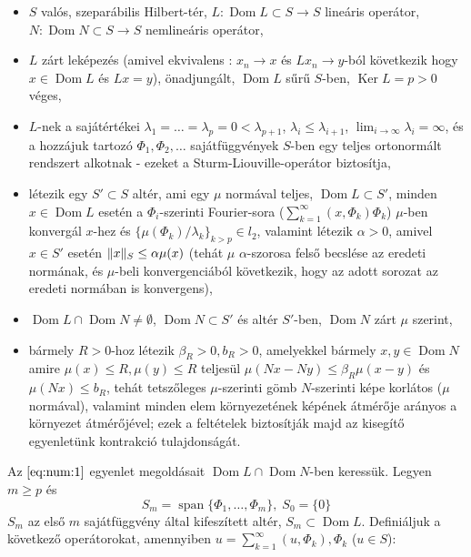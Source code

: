 \documentclass[oneside, titlepage, 12pt, a4paper]{report}
\DeclareMathOperator{\Ker}{Ker}	%
\DeclareMathOperator{\Dom}{Dom}	%
\DeclareMathOperator{\Span}{span}	%
\DeclarePairedDelimiter\norm{\lVert}{\rVert}	%
\begin{document}
\begin{itemize}
\item $S$ valós, szeparábilis Hilbert-tér, $L : \Dom L \subset S \rightarrow S$ lineáris operátor, $N : \Dom N \subset S \rightarrow S$ nemlineáris operátor,
\item $L$ zárt leképezés (amivel ekvivalens \cite{funkanal}: $x_n \rightarrow x$ és $Lx_n \rightarrow y$-ból következik hogy $x \in \Dom L$ és $Lx = y$), önadjungált, $\Dom L$ sűrű $S$-ben, $\Ker L = p > 0$ véges,
\item $L$-nek a sajátértékei $\lambda_1 = \dots = \lambda_p = 0 < \lambda_{p + 1}$, $\lambda_i \leq \lambda_{i + 1}$, $\lim_{i \to \infty} \lambda_i = \infty$, és a hozzájuk tartozó $\Phi_1, \Phi_2, \dots$ sajátfüggvények $S$-ben egy teljes ortonormált rendszert alkotnak - ezeket a Sturm-Liouville-operátor biztosítja, %
\item létezik egy $S' \subset S$ altér, ami egy $\mu$ normával teljes, $\Dom L \subset S'$, minden $x \in \Dom L$ esetén a $\Phi_i$-szerinti Fourier-sora ($\sum_{k=1}^\infty (x, \Phi_k) \Phi_k$) $\mu$-ben konvergál $x$-hez és $\{ \mu(\Phi_k) / \lambda_k\}_{k > p} \in l_2$, valamint létezik $\alpha > 0$, amivel $x \in S'$ esetén $\norm {x}_S \leq \alpha \mu(x)$ (tehát $\mu$ $\alpha$-szorosa felső becslése az eredeti normának, és $\mu$-beli konvergenciából következik, hogy az adott sorozat az eredeti normában is konvergens),
\item $\Dom L \cap \Dom N \neq \emptyset$, $\Dom N \subset S'$ és altér $S'$-ben, $\Dom N$ zárt $\mu$ szerint,
\item bármely $R > 0$-hoz létezik $\beta_R > 0, b_R > 0$, amelyekkel bármely $x, y \in \Dom N$ amire $\mu(x) \leq R, \mu(y) \leq R$ teljesül $\mu(Nx - Ny) \leq \beta_R \mu(x - y)$ és $\mu(Nx) \leq b_R$, tehát tetszőleges $\mu$-szerinti gömb $N$-szerinti képe korlátos ($\mu$ normával), valamint minden elem környezetének képének átmérője arányos a környezet átmérőjével; ezek a feltételek biztosítják majd az kisegítő egyenletünk kontrakció tulajdonságát. %
\end{itemize}
Az $\eqref{eq:num:1}$ egyenlet megoldásait $\Dom L \cap \Dom N$-ben keressük. Legyen $m \geq p$ és
\begin{equation*}
S_m = \Span \{\Phi_1, \dots, \Phi_m \}, \; S_0 = \{ 0\}
\end{equation*}
$S_m$ az első $m$ sajátfüggvény által kifeszített altér, $S_m \subset \Dom L$. Definiáljuk a következő operátorokat, amennyiben $u = \sum_{k = 1}^\infty (u, \Phi_k), \Phi_k$ ($u \in S$):
\end{document}
